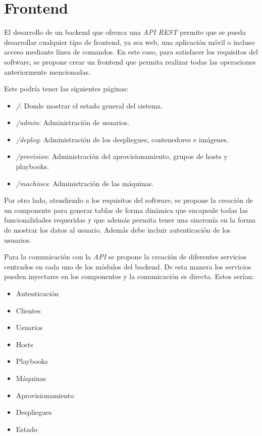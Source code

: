 \section{Frontend}

El desarrollo de un backend que ofrezca una \textit{API REST} permite que se pueda desarrollar cualquier tipo de frontend, ya sea web, una aplicación móvil o incluso acceso mediante línea de comandos. En este caso, para satisfacer los requisitos del software, se propone crear un frontend que permita realizar todas las operaciones anteriormente mencionadas.

\bigskip
Este podría tener las siguientes páginas:
\begin{itemize}
	\item \textit{/}: Donde mostrar el estado general del sistema.
	\item \textit{/admin}: Administración de usuarios.
	\item \textit{/deploy}: Administración de los despliegues, contenedores e imágenes.
	\item \textit{/provision}: Administración del aprovisionamiento, grupos de hosts y playbooks.
	\item \textit{/machines}: Administración de las máquinas.
\end{itemize}

\bigskip
Por otro lado, atendiendo a los requisitos del software, se propone la creación de un componente para generar tablas de forma dinámica que encapsule todas las funcionalidades requeridas y que además permita tener una sincronía en la forma de mostrar los datos al usuario. Además debe incluir autenticación de los usuarios.

Para la comunicación con la \textit{API} se propone la creación de diferentes servicios centrados en cada uno de los módulos del backend. De esta manera los servicios pueden inyectarse en los componentes y la comunicación es directa. Estos serían:
\begin{itemize}
	\item Autenticación
	\item Clientes
	\item Usuarios
	\item Hosts
	\item Playbooks
	\item Máquinas
	\item Aprovisionamiento
	\item Despliegues
	\item Estado
\end{itemize}

